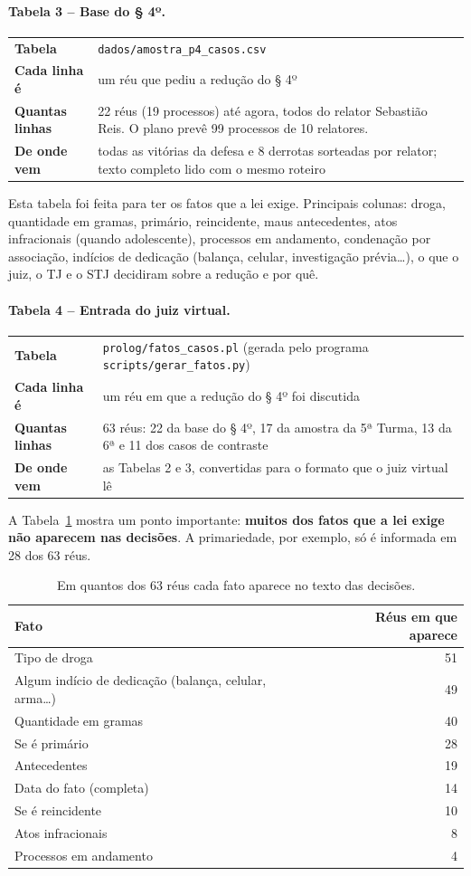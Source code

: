 \documentclass[11pt,a4paper]{article}
\newcommand{\ficha}[4]{%
\begin{center}\small
\begin{tabular}{>{\bfseries}p{3.2cm}p{11.5cm}}
\toprule
Tabela & #1 \\
Cada linha é & #2 \\
Quantas linhas & #3 \\
De onde vem & #4 \\
\bottomrule
\end{tabular}
\end{center}}
\begin{document}
\paragraph{Tabela 3 -- Base do § 4º.}
\ficha{\texttt{dados/amostra\_p4\_casos.csv}}
      {um réu que pediu a redução do § 4º}
      {22 réus (19 processos) até agora, todos do relator Sebastião Reis. O plano prevê 99 processos de 10 relatores.}
      {todas as vitórias da defesa e 8 derrotas sorteadas por relator; texto completo lido com o mesmo roteiro}

Esta tabela foi feita para ter os fatos que a lei exige. Principais colunas:
droga, quantidade em gramas, primário, reincidente, maus antecedentes, atos infracionais
(quando adolescente), processos em andamento, condenação por associação, indícios de
dedicação (balança, celular, investigação prévia\ldots), o que o juiz, o TJ e o STJ decidiram
sobre a redução e por quê.

\paragraph{Tabela 4 -- Entrada do juiz virtual.}
\ficha{\texttt{prolog/fatos\_casos.pl} (gerada pelo programa \texttt{scripts/gerar\_fatos.py})}
      {um réu em que a redução do § 4º foi discutida}
      {63 réus: 22 da base do § 4º, 17 da amostra da 5ª Turma, 13 da 6ª e 11 dos casos de contraste}
      {as Tabelas 2 e 3, convertidas para o formato que o juiz virtual lê}

A Tabela~\ref{tab:cobertura} mostra um ponto importante: \textbf{muitos dos fatos que a lei
exige não aparecem nas decisões}. A primariedade, por exemplo, só é informada em 28 dos 63
réus.

\begin{table}[h]
\centering\small
\caption{Em quantos dos 63 réus cada fato aparece no texto das decisões.}
\label{tab:cobertura}
\begin{tabular}{lr}
\toprule
Fato & Réus em que aparece \\
\midrule
Tipo de droga & 51 \\
Algum indício de dedicação (balança, celular, arma\ldots) & 49 \\
Quantidade em gramas & 40 \\
Se é primário & 28 \\
Antecedentes & 19 \\
Data do fato (completa) & 14 \\
Se é reincidente & 10 \\
Atos infracionais & 8 \\
Processos em andamento & 4 \\
\bottomrule
\end{tabular}
\end{table}
\end{document}
